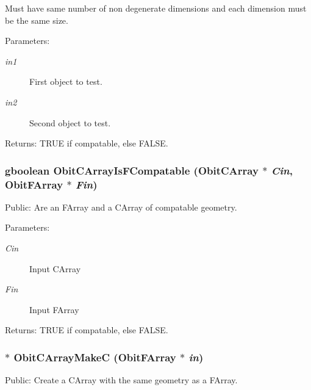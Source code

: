 Must have same number of non degenerate dimensions and each dimension must be the same size. \begin{Desc}
\item[Parameters:]
\begin{description}
\item[{\em in1}]First object to test. \item[{\em in2}]Second object to test. \end{description}
\end{Desc}
\begin{Desc}
\item[Returns:]TRUE if compatable, else FALSE. \end{Desc}
\subsubsection{\setlength{\rightskip}{0pt plus 5cm}gboolean Obit\-CArray\-Is\-FCompatable ({\bf Obit\-CArray} $\ast$ {\em Cin}, {\bf Obit\-FArray} $\ast$ {\em Fin})}\label{ObitCArray_8h_a58}


Public: Are an FArray and a CArray of compatable geometry. 

\begin{Desc}
\item[Parameters:]
\begin{description}
\item[{\em Cin}]Input CArray \item[{\em Fin}]Input FArray \end{description}
\end{Desc}
\begin{Desc}
\item[Returns:]TRUE if compatable, else FALSE. \end{Desc}
\subsubsection{$\ast$ Obit\-CArray\-Make\-C ({\bf Obit\-FArray} $\ast$ {\em in})}\label{ObitCArray_8h_a57}


Public: Create a CArray with the same geometry as a FArray. 

